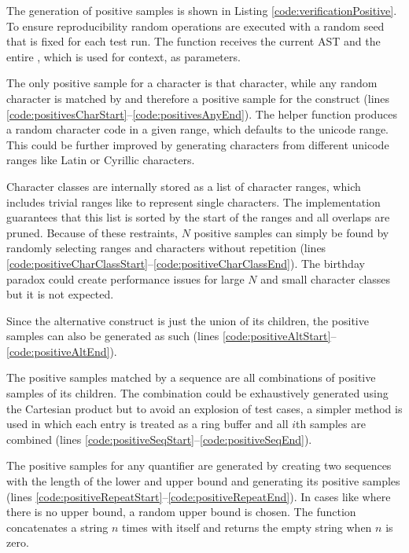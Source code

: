 The generation of positive samples is shown in Listing \ref{code:verificationPositive}. To ensure reproducibility random operations are executed with a random seed that is fixed for each test run. The function receives the current AST  and the entire , which is used for context, as parameters.

The only positive sample for a character is that character, while any random character is matched by and therefore a positive sample for the  construct (lines \ref{code:positivesCharStart}--\ref{code:positivesAnyEnd}). The helper function  produces a random character code in a given range, which defaults to the unicode range. This could be further improved by generating characters from different unicode ranges like Latin or Cyrillic characters.

Character classes are internally stored as a list of character ranges, which includes trivial ranges like \pattern{[a-a]} to represent single characters. The implementation guarantees that this list is sorted by the start of the ranges and all overlaps are pruned. Because of these restraints, $N$ positive samples can simply be found by randomly selecting ranges and characters without repetition (lines \ref{code:positiveCharClassStart}--\ref{code:positiveCharClassEnd}). The birthday paradox could create performance issues for large $N$ and small character classes but it is not expected.

Since the alternative construct is just the union of its children, the positive samples can also be generated as such (lines \ref{code:positiveAltStart}--\ref{code:positiveAltEnd}).

The positive samples matched by a sequence are all combinations of positive samples of its children. The combination could be exhaustively generated using the Cartesian product but to avoid an explosion of test cases, a simpler method is used in which each entry is treated as a ring buffer and all $i$th samples are combined (lines \ref{code:positiveSeqStart}--\ref{code:positiveSeqEnd}).

The positive samples for any quantifier are generated by creating two sequences with the length of the lower and upper bound and generating its positive samples (lines \ref{code:positiveRepeatStart}--\ref{code:positiveRepeatEnd}). In cases like  where there is no upper bound, a random upper bound is chosen. The function  concatenates a string $n$ times with itself and returns the empty string when $n$ is zero.

